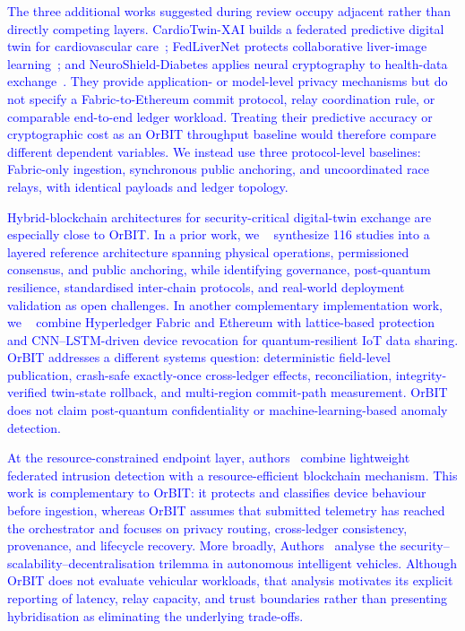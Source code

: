\documentclass[final,5p,times,twocolumn]{elsarticle}
\begin{document}
\textcolor{blue}{The three additional works suggested during review occupy adjacent rather than directly competing layers. CardioTwin-XAI builds a federated predictive digital twin for cardiovascular care~\cite{yang2026cardiotwin}; FedLiverNet protects collaborative liver-image learning~\cite{lou2026fedlivernet}; and NeuroShield-Diabetes applies neural cryptography to health-data exchange~\cite{yang2026neuroshield}. They provide application- or model-level privacy mechanisms but do not specify a Fabric-to-Ethereum commit protocol, relay coordination rule, or comparable end-to-end ledger workload. Treating their predictive accuracy or cryptographic cost as an OrBIT throughput baseline would therefore compare different dependent variables. We instead use three protocol-level baselines: Fabric-only ingestion, synchronous public anchoring, and uncoordinated race relays, with identical payloads and ledger topology.}

\textcolor{blue}{Hybrid-blockchain architectures for security-critical digital-twin exchange are especially close to OrBIT. In a prior work, we ~\cite{amadi2026security} synthesize 116 studies into a layered reference architecture spanning physical operations, permissioned consensus, and public anchoring, while identifying governance, post-quantum resilience, standardised inter-chain protocols, and real-world deployment validation as open challenges. In another complementary implementation work, we ~\cite{amadi2026symmetric} combine Hyperledger Fabric and Ethereum with lattice-based protection and CNN--LSTM-driven device revocation for quantum-resilient IoT data sharing. OrBIT addresses a different systems question: deterministic field-level publication, crash-safe exactly-once cross-ledger effects, reconciliation, integrity-verified twin-state rollback, and multi-region commit-path measurement. OrBIT does not claim post-quantum confidentiality or machine-learning-based anomaly detection.}

\textcolor{blue}{At the resource-constrained endpoint layer, authors~\cite{amadi2026lightweight} combine lightweight federated intrusion detection with a resource-efficient blockchain mechanism. This work is complementary to OrBIT: it protects and classifies device behaviour before ingestion, whereas OrBIT assumes that submitted telemetry has reached the orchestrator and focuses on privacy routing, cross-ledger consistency, provenance, and lifecycle recovery. More broadly, Authors~\cite{amadi2026blockchain} analyse the security--scalability--decentralisation trilemma in autonomous intelligent vehicles. Although OrBIT does not evaluate vehicular workloads, that analysis motivates its explicit reporting of latency, relay capacity, and trust boundaries rather than presenting hybridisation as eliminating the underlying trade-offs.}
\end{document}
